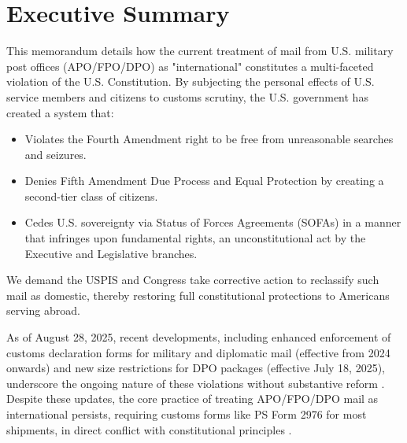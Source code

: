 ﻿\section*{Executive Summary}

This memorandum details how the current treatment of mail from U.S. military post offices (APO/FPO/DPO) as "international" constitutes a multi-faceted violation of the U.S. Constitution. By subjecting the personal effects of U.S. service members and citizens to customs scrutiny, the U.S. government has created a system that:
\begin{itemize}
\item Violates the Fourth Amendment right to be free from unreasonable searches and seizures.
\item Denies Fifth Amendment Due Process and Equal Protection by creating a second-tier class of citizens.
\item Cedes U.S. sovereignty via Status of Forces Agreements (SOFAs) in a manner that infringes upon fundamental rights, an unconstitutional act by the Executive and Legislative branches.
\end{itemize}

We demand the USPIS and Congress take corrective action to reclassify such mail as domestic, thereby restoring full constitutional protections to Americans serving abroad.

As of August 28, 2025, recent developments, including enhanced enforcement of customs declaration forms for military and diplomatic mail (effective from 2024 onwards) and new size restrictions for DPO packages (effective July 18, 2025), underscore the ongoing nature of these violations without substantive reform \cite{usps2024enhanced} \cite{dod2025dpo}. Despite these updates, the core practice of treating APO/FPO/DPO mail as international persists, requiring customs forms like PS Form 2976 for most shipments, in direct conflict with constitutional principles \cite{usps2023imm} \cite{cbp2023guide}.
